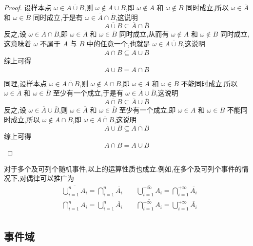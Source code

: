 \begin{proof}
    设样本点 $\omega \in \overline{A \cup B}$,则 $\omega \notin A \cup B$,即 $\omega \notin A$ 和 $\omega \notin B$ 同时成立,所以 $\omega \in \overline{A}$ 和 $\omega \in \overline{B}$ 同时成立,于是有 $\omega \in \overline{A} \cap \overline{B}$,这说明
    $$
    \overline{A \cup B} \subseteq \overline{A} \cap \overline{B}
    $$
    反之,设 $\omega \in \overline{A} \cap \overline{B}$,即 $\omega \in \overline{A}$ 和 $\omega \in \overline{B}$ 同时成立,从而有 $\omega \notin A$ 和 $\omega \notin B$ 同时成立,这意味着 $\omega$ 不属于 $A$ 与 $B$ 中的任意一个,也就是 $\omega \in \overline{A \cup B}$,这说明
    $$
    \overline{A} \cap \overline{B} \subseteq \overline{A \cup B}
    $$
    综上可得
    $$
    \overline{A \cup B} = \overline{A} \cap \overline{B}
    $$

    同理,设样本点 $\omega \in \overline{A \cap B}$,则 $\omega \notin A \cap B$,即 $\omega \in A$ 和 $\omega \in B$ 不能同时成立,所以 $\omega \in \overline{A}$ 和 $\omega \in \overline{B}$ 至少有一个成立,于是有 $\omega \in \overline{A} \cup \overline{B}$,这说明
    $$
    \overline{A \cap B} \subseteq \overline{A} \cup \overline{B}
    $$
    反之,设 $\omega \in \overline{A} \cup \overline{B}$,则 $\omega \in \overline{A}$ 和 $\omega \in \overline{B}$ 至少有一个成立,即 $\omega \in A$ 和 $\omega \in B$ 不能同时成立,所以 $\omega \notin A \cap B$,即 $\omega \in \overline{A \cap B}$,这说明
    $$
    \overline{A} \cup \overline{B} \subseteq \overline{A \cap B}
    $$
    综上可得
    $$
    \overline{A \cap B} = \overline{A} \cup \overline{B}
    $$
\end{proof}

对于多个及可列个随机事件,以上的运算性质也成立.例如,在多个及可列个事件的情况下,对偶律可以推广为
$$
\begin{aligned}
    & \overline{\bigcup_{i=1}^n A_i} = \bigcap_{i=1}^n \overline{A_i} \qquad \overline{\bigcup_{i=1}^{+\infty} A_i} = \bigcap_{i=1}^{+\infty} \overline{A_i} \\
    & \overline{\bigcap_{i=1}^n A_i} = \bigcup_{i=1}^n \overline{A_i} \qquad \overline{\bigcap_{i=1}^{+\infty} A_i} = \bigcup_{i=1}^{+\infty} \overline{A_i} \\
\end{aligned}
$$

\subsection{事件域}

